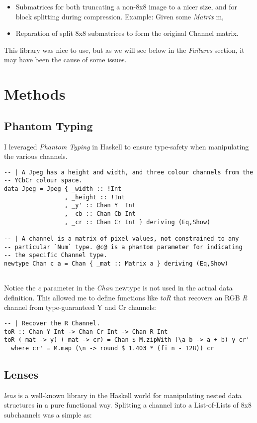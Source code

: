 \documentclass{article}
\begin{document}
\begin{itemize}
\item Submatrices for both truncating a non-8x8 image to a nicer size, and
  for block splitting during compression.
  Example: Given some \emph{Matrix} m, 
\item Reparation of split 8x8 submatrices to form the original Channel matrix.
\end{itemize}

This library was nice to use, but as we will see below in the \emph{Failures}
section, it may have been the cause of some issues.

\section{Methods}
\subsection{Phantom Typing}
I leveraged \emph{Phantom Typing} in Haskell to ensure type-safety
when manipulating the various channels.

\begin{lstlisting}
-- | A Jpeg has a height and width, and three colour channels from the
-- YCbCr colour space.
data Jpeg = Jpeg { _width :: !Int
                 , _height :: !Int
                 , _y' :: Chan Y  Int
                 , _cb :: Chan Cb Int
                 , _cr :: Chan Cr Int } deriving (Eq,Show)

-- | A channel is a matrix of pixel values, not constrained to any
-- particular `Num` type. @c@ is a phantom parameter for indicating
-- the specific Channel type.
newtype Chan c a = Chan { _mat :: Matrix a } deriving (Eq,Show)
  
\end{lstlisting}

Notice the \emph{c} parameter in the \emph{Chan} newtype is not used in
the actual data definition. This allowed me to define functions like
\emph{toR} that recovers an RGB \emph{R} channel from type-guaranteed
Y and Cr channels:

\begin{lstlisting}
-- | Recover the R Channel.
toR :: Chan Y Int -> Chan Cr Int -> Chan R Int
toR (_mat -> y) (_mat -> cr) = Chan $ M.zipWith (\a b -> a + b) y cr'
  where cr' = M.map (\n -> round $ 1.403 * (fi n - 128)) cr
\end{lstlisting}

\subsection{Lenses}
\emph{lens} is a well-known library in the Haskell world for manipulating
nested data structures in a pure functional way. Splitting a channel
into a List-of-Lists of 8x8 subchannels was a simple as:
\end{document}

